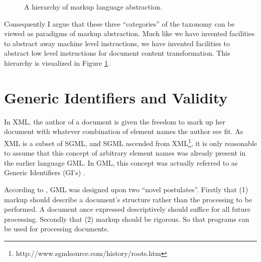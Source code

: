 \documentclass{scrreprt}
\begin{document}
\begin{figure}[h]
\centering


\caption{A hierarchy of markup language abstraction.}
\label{fig:markup-types-hierarchy}
\end{figure}



Consequently I argue that these three ``categories'' of the taxonomy can be viewed as paradigms of markup abstraction. Much like we have invented facilities to abstract away machine level instructions, we have invented facilities to abstract low level instructions for document content transformation. This hierarchy is visualized in Figure \ref{fig:markup-types-hierarchy}.  











\section{Generic Identifiers and Validity}
\label{sec:theory:generic-identifiers-and-validity}

In XML, the author of a document is given the freedom to mark up her document with whatever combination of element names the author see fit. As XML is a subset of SGML, and SGML ascended from XML\footnote{http://www.sgmlsource.com/history/roots.htm}, it is only reasonable to assume that this concept of arbitrary element names was already present in the earlier language GML. In GML, this concept was actually referred to as Generic Identifiers (GI's) \citet{goldfarb}.

According to \citet{goldfarb}, GML was designed upon two ``novel postulates''. Firstly that (1) markup should describe a document's structure rather than the processing to be performed. A document once expressed descriptively should suffice for all future processing. Secondly that (2) markup should be rigorous. So that programs can be used for processing documents.
\end{document}

